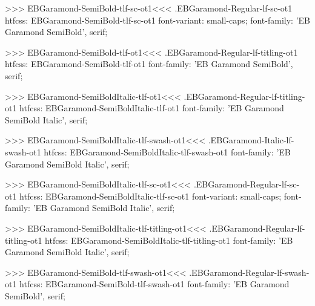 {{{{{{{>>>
\<EBGaramond-SemiBold-tlf-sc-ot1\><<<
.EBGaramond-Regular-lf-sc-ot1
htfcss:  EBGaramond-SemiBold-tlf-sc-ot1  font-variant: small-caps; font-family: 'EB Garamond SemiBold', serif;

>>>
\<EBGaramond-SemiBold-tlf-ot1\><<<
.EBGaramond-Regular-lf-titling-ot1
htfcss:  EBGaramond-SemiBold-tlf-ot1  font-family: 'EB Garamond SemiBold', serif;

>>>
\<EBGaramond-SemiBoldItalic-tlf-ot1\><<<
.EBGaramond-Regular-lf-titling-ot1
htfcss:  EBGaramond-SemiBoldItalic-tlf-ot1  font-family: 'EB Garamond SemiBold Italic', serif;

>>>
\<EBGaramond-SemiBoldItalic-tlf-swash-ot1\><<<
.EBGaramond-Italic-lf-swash-ot1
htfcss:  EBGaramond-SemiBoldItalic-tlf-swash-ot1  font-family: 'EB Garamond SemiBold Italic', serif;

>>>
\<EBGaramond-SemiBoldItalic-tlf-sc-ot1\><<<
.EBGaramond-Regular-lf-sc-ot1
htfcss:  EBGaramond-SemiBoldItalic-tlf-sc-ot1  font-variant: small-caps; font-family: 'EB Garamond SemiBold Italic', serif;

>>>
\<EBGaramond-SemiBoldItalic-tlf-titling-ot1\><<<
.EBGaramond-Regular-lf-titling-ot1
htfcss:  EBGaramond-SemiBoldItalic-tlf-titling-ot1  font-family: 'EB Garamond SemiBold Italic', serif;

>>>
\<EBGaramond-SemiBold-tlf-swash-ot1\><<<
.EBGaramond-Regular-lf-swash-ot1
htfcss:  EBGaramond-SemiBold-tlf-swash-ot1  font-family: 'EB Garamond SemiBold', serif;

}}}}}}}
